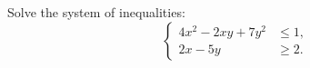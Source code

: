 Solve the system of inequalities: \[\left\{\begin{aligned} 4x^{2}-2xy+7y^{2} &\leqslant1, \\ 2x-5y &\geqslant2. \end{aligned}\right.\]
